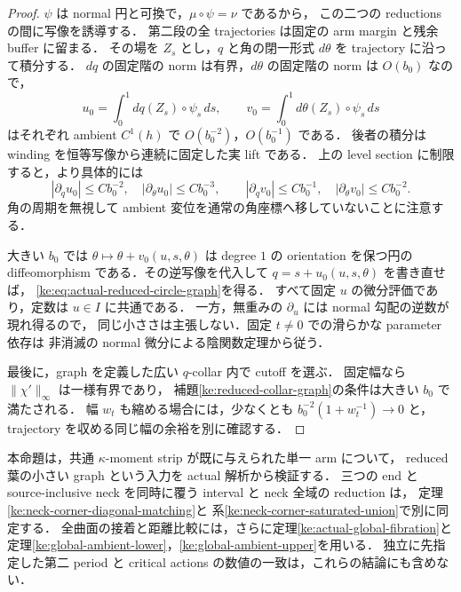 \begin{proof}
$\psi$ は normal 円と可換で，$\mu\circ\psi=\nu$ であるから，
この二つの reductions の間に写像を誘導する．
第二段の全 trajectories は固定の arm margin と残余 buffer に留まる．
その場を $Z_s$ とし，$q$ と角の閉一形式 $d\theta$ を trajectory に沿って積分する．
$dq$ の固定階の norm は有界，$d\theta$ の固定階の norm は $O(b_0)$ なので，
\[
 u_0=\int_0^1dq(Z_s)\circ\psi_s\,ds,
 \qquad
 v_0=\int_0^1d\theta(Z_s)\circ\psi_s\,ds
\]
はそれぞれ ambient $C^1(h)$ で $O(b_0^{-2})$，$O(b_0^{-1})$ である．
後者の積分は winding を恒等写像から連続に固定した実 lift である．
上の level section に制限すると，より具体的には
\[
 |\partial_q u_0|\le Cb_0^{-2},\quad
 |\partial_\theta u_0|\le Cb_0^{-3},\qquad
 |\partial_q v_0|\le Cb_0^{-1},\quad
 |\partial_\theta v_0|\le Cb_0^{-2}.
\]
角の周期を無視して ambient 変位を通常の角座標へ移していないことに注意する．

大きい $b_0$ では $\theta\mapsto\theta+v_0(u,s,\theta)$ は degree $1$ の
orientation を保つ円の diffeomorphism である．その逆写像を代入して
$q=s+u_0(u,s,\theta)$ を書き直せば，
\eqref{ke:eq:actual-reduced-circle-graph}を得る．
すべて固定 $u$ の微分評価であり，定数は $u\in I$ に共通である．
一方，無重みの $\partial_u$ には normal 勾配の逆数が現れ得るので，
同じ小ささは主張しない．固定 $t\ne0$ での滑らかな parameter 依存は
非消滅の normal 微分による陰関数定理から従う．

最後に，graph を定義した広い $q$-collar 内で cutoff を選ぶ．
固定幅なら $\|\chi'\|_\infty$ は一様有界であり，
補題\ref{ke:reduced-collar-graph}の条件は大きい $b_0$ で満たされる．
幅 $w_t$ も縮める場合には，少なくとも
$b_0^{-2}(1+w_t^{-1})\to0$ と，trajectory を収める同じ幅の余裕を別に確認する．
\end{proof}

本命題は，共通 $\kappa$-moment strip が既に与えられた単一 arm について，
reduced 葉の小さい graph という入力を actual 解析から検証する．
三つの end と source-inclusive neck を同時に覆う interval と neck 全域の reduction は，
定理\ref{ke:neck-corner-diagonal-matching}と
系\ref{ke:neck-corner-saturated-union}で別に同定する．
全曲面の接着と距離比較には，さらに定理\ref{ke:actual-global-fibration}と
定理\ref{ke:global-ambient-lower}，\ref{ke:global-ambient-upper}を用いる．
独立に先指定した第二 period と critical actions の数値の一致は，これらの結論にも含めない．

